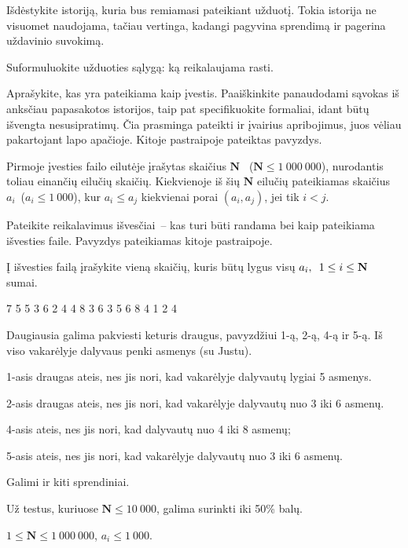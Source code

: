 \documentclass{liostyle}
\newcommand{\maxN}{1\ 000\ 000}
\newcommand{\maxA}{1\ 000}
\begin{document}
Išdėstykite istoriją, kuria bus remiamasi pateikiant užduotį. Tokia
istorija ne visuomet naudojama, tačiau vertinga, kadangi pagyvina
sprendimą ir pagerina uždavinio suvokimą.

\Task
Suformuluokite užduoties sąlygą: ką reikalaujama rasti.

\Input
Aprašykite, kas yra pateikiama kaip įvestis. Paaiškinkite panaudodami
sąvokas iš anksčiau papasakotos istorijos, taip pat specifikuokite
formaliai, idant būtų išvengta nesusipratimų. Čia prasminga pateikti
ir įvairius apribojimus, juos vėliau pakartojant lapo apačioje. Kitoje
pastraipoje pateiktas pavyzdys.

Pirmoje įvesties failo eilutėje įrašytas skaičius $\mathbf{N}$~%
($\mathbf{N}\le\maxN$), nurodantis toliau einančių eilučių skaičių.
Kiekvienoje iš šių $\mathbf{N}$ eilučių pateikiamas skaičius $a_i$~($a_i\le\maxA$),
kur $a_i\le a_j$ kiekvienai porai $(a_i, a_j)$, jei tik $i<j$.

\Output
Pateikite reikalavimus išvesčiai~-- kas turi būti randama bei kaip
pateikiama išvesties faile. Pavyzdys pateikiamas kitoje pastraipoje.

Į išvesties failą įrašykite vieną skaičių, kuris būtų lygus
visų $a_i,\enskip 1\le i\le\mathbf{N}$ sumai.

\Examples


\example%
{
7
5 5
3 6
2 4
4 8
3 6
3 5
6 8
}%
{
4
1
2
4
}%
{
Daugiausia galima pakviesti keturis draugus,
pavyzdžiui 1-ą, 2-ą, 4-ą ir 5-ą. Iš
viso vakarėlyje dalyvaus penki asmenys (su
Justu).

1-asis draugas ateis, nes jis nori, kad
vakarėlyje dalyvautų lygiai 5 asmenys. 

2-asis draugas ateis, nes jis nori, kad
vakarėlyje dalyvautų nuo 3 iki 6 asmenų. 

4-asis ateis, nes jis nori, kad dalyvautų nuo
4 iki 8 asmenų;

5-asis ateis, nes jis nori, kad vakarėlyje
dalyvautų nuo 3 iki 6 asmenų.

Galimi ir kiti sprendiniai.
}

\Grading
Už testus, kuriuose $\mathbf{N} \le 10\ 000$, galima surinkti iki 50\% balų.

\Constraints
$1\le\mathbf{N} \le \maxN$,\enskip
$a_i\le\maxA$.
\end{document}
